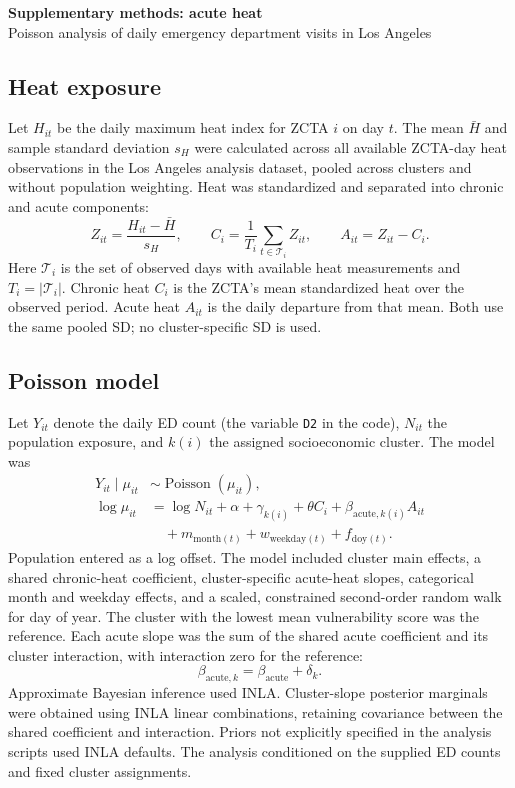 \documentclass[11pt,letterpaper]{article}
\begin{document}
\begin{center}
{\Large\bfseries Supplementary methods: acute heat}\\[0.4em]
{Poisson analysis of daily emergency department visits in Los Angeles}
\end{center}

\subsection*{Heat exposure}
Let $H_{it}$ be the daily maximum heat index for ZCTA $i$ on day $t$.
The mean $\bar H$ and sample standard deviation $s_H$ were calculated across
all available ZCTA-day heat observations in the Los Angeles analysis dataset,
pooled across clusters and without population weighting. Heat was standardized
and separated into chronic and acute components:
\begin{equation}
Z_{it}=\frac{H_{it}-\bar H}{s_H},\qquad
C_i=\frac{1}{T_i}\sum_{t\in\mathcal T_i}Z_{it},\qquad
A_{it}=Z_{it}-C_i.
\end{equation}
Here $\mathcal T_i$ is the set of observed days with available heat measurements
and $T_i=|\mathcal T_i|$. Chronic heat $C_i$ is the ZCTA's mean standardized
heat over the observed period. Acute heat $A_{it}$ is the daily departure from
that mean. Both use the same pooled SD; no cluster-specific SD is used.

\subsection*{Poisson model}
Let $Y_{it}$ denote the daily ED count (the variable \texttt{D2} in the code),
$N_{it}$ the population exposure, and $k(i)$ the assigned socioeconomic cluster.
The model was
\begin{align}
Y_{it}\mid\mu_{it}&\sim\operatorname{Poisson}(\mu_{it}),\\
\log\mu_{it}&=\log N_{it}+\alpha+\gamma_{k(i)}+\theta C_i
  +\beta_{\mathrm{acute},k(i)}A_{it}\nonumber\\
&\quad +m_{\mathrm{month}(t)}+w_{\mathrm{weekday}(t)}
  +f_{\mathrm{doy}(t)}.
\end{align}
Population entered as a log offset. The model included cluster main effects,
a shared chronic-heat coefficient, cluster-specific acute-heat slopes,
categorical month and weekday effects, and a scaled, constrained second-order
random walk for day of year. The cluster with the lowest mean vulnerability
score was the reference. Each acute slope was the sum of the shared acute
coefficient and its cluster interaction, with interaction zero for the reference:
\begin{equation}
\beta_{\mathrm{acute},k}=\beta_{\mathrm{acute}}+\delta_k.
\end{equation}
Approximate Bayesian inference used INLA. Cluster-slope posterior marginals
were obtained using INLA linear combinations, retaining covariance between the
shared coefficient and interaction. Priors not explicitly specified in the
analysis scripts used INLA defaults. The analysis conditioned on the supplied
ED counts and fixed cluster assignments.
\end{document}
